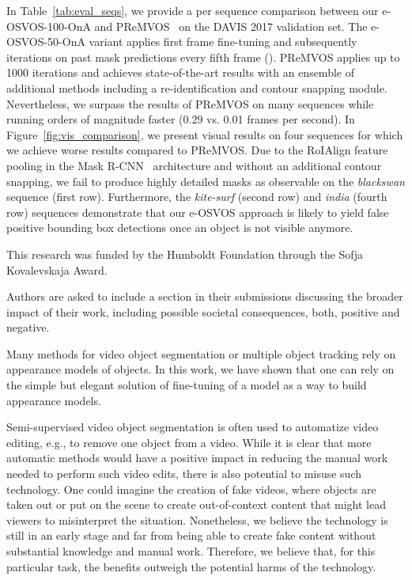 \documentclass{article}
\begin{document}
    In Table~\ref{tab:eval_seqs}, we provide a per sequence comparison between our e-OSVOS-100-OnA and PReMVOS~\cite{luiten2018premvos} on the DAVIS 2017 validation set.
The e-OSVOS-50-OnA variant applies  first frame fine-tuning and subsequently  iterations on past mask predictions every fifth frame ().
PReMVOS applies up to 1000 iterations and achieves state-of-the-art results with an ensemble of additional methods including a re-identification and contour snapping module.
Nevertheless, we surpass the results of PReMVOS on many sequences while running orders of magnitude faster (0.29 vs. 0.01 frames per second).
In Figure~\ref{fig:vis_comparison}, we present visual results on four sequences for which we achieve worse results compared to PReMVOS.
Due to the RoIAlign feature pooling in the Mask R-CNN~\cite{MaskRCNN} architecture and without an additional contour snapping, we fail to produce highly detailed masks as observable on the \textit{blackswan} sequence (first row).
Furthermore, the \textit{kite-surf} (second row) and \textit{india} (fourth row) sequences demonstrate that our e-OSVOS approach is likely to yield false positive bounding box detections once an object is not visible anymore.
 \fi

\clearpage
{}

This research was funded by the Humboldt Foundation through the Sofja Kovalevskaja Award. 


Authors are asked to include a section in their submissions discussing the broader impact of their work, including possible societal consequences, both, positive and negative.


Many methods for video object segmentation or multiple object tracking rely on appearance models of objects.
In this work, we have shown that one can rely on the simple but elegant solution of fine-tuning of a model as a way to build appearance models.


Semi-supervised video object segmentation is often used to automatize video editing, e.g., to remove one object from a video.
While it is clear that more automatic methods would have a positive impact in reducing the manual work needed to perform such video edits, there is also potential to misuse such technology. One could imagine the creation of fake videos, where objects are taken out or put on the scene to create out-of-context content that might lead viewers to misinterpret the situation.
Nonetheless, we believe the technology is still in an early stage and far from being able to create fake content without substantial knowledge and manual work.
Therefore, we believe that, for this particular task, the benefits outweigh the potential harms of the technology.
\end{document}
